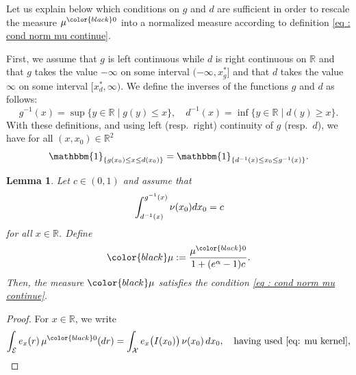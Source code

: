 \documentclass[a4paper, 11pt]{article}
\newtheorem{lemma}{Lemma}
\theoremstyle{definition}
\newcommand{\modar}{\color{black}}
\begin{document}
{{Let us explain below which conditions on $g$ and $d$ are sufficient in order to rescale the measure $\mu^{\modar0}$ into a normalized measure according to definition
\eqref{eq : cond norm mu continue}.

First, we assume that $g$ is left continuous while $d$ is right continuous on $\mathbb{R}$ and that $g$ takes the value $-\infty$ on some interval $(-\infty,x^*_g]$
and that  
$d$ takes the value $\infty$ on some interval $[x^*_d,\infty)$.
We define the inverses of the functions $g$ and $d$ as follows:
\begin{equation*}
	g^{-1}(x)=\sup \{ y \in \mathbb{R} \mid g(y) \le x \}, 
	\quad
	d^{-1}(x)=\inf \{ y \in \mathbb{R} \mid d(y) \ge x \}. 
\end{equation*}
With these definitions, and using left (resp.\ right) continuity of $g$ (resp.\ $d$), we have for all $(x,x_0) \in \mathbb{R}^2$
\begin{equation}\label{eq: inverse function l r}
	\mathbbm{1}_{\{g(x_0) \le x \le d(x_0)\}} 
	= \mathbbm{1}_{\{d^{-1}(x) \le x_0 \le g^{-1}(x)\}}.
\end{equation}
\begin{lemma}\label{l : first step staircase}
	Let $c \in (0,1)$ and assume that 
    \begin{equation}{\label{eq: cond 28.5}}
    \int_{d^{-1}(x)}^{g^{-1}(x)} \nu(x_0)dx_0=c
    \end{equation}
    for all $x \in \mathbb{R}$.
	Define 
	\begin{equation*}{\modar \mu} := \frac{\mu^{\modar0}}{1 + (e^\alpha - 1)c}.
	\end{equation*}
	 Then, the measure ${\modar \mu}$ satisfies the condition \eqref{eq : cond norm mu continue}. 
	\end{lemma}
	\begin{proof} For $x \in \mathbb{R}$, we write
		\begin{align*}
			\int_{\mathcal{E}} e_{x}(r)\, \mu^{\modar0}(dr) 
			&= \int_\mathcal{X} e_{x}\big( I(x_0) \big)\, \nu(x_0)\, dx_0,
\quad \text{having used \eqref{eq: mu kernel},}			
			 \\

\end{align*}
\end{proof}}}
\end{document}
